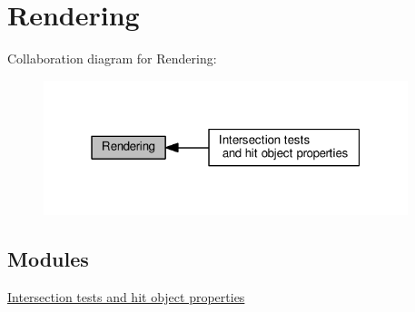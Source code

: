 \hypertarget{group__rendering}{}\section{Rendering}
\label{group__rendering}
Collaboration diagram for Rendering\+:
\nopagebreak
\begin{figure}[H]
\begin{center}
\leavevmode
\includegraphics[width=301pt]{group__rendering}
\end{center}
\end{figure}
\subsection*{Modules}
\begin{DoxyCompactItemize}
\item 
\hyperlink{group__intersection__test__prperties}{Intersection tests and hit object properties}
\end{DoxyCompactItemize}
